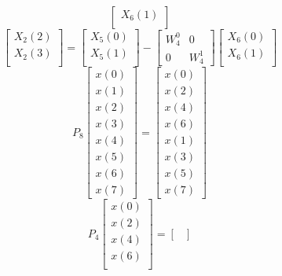 \documentclass[journal,12pt,twocolumn]{IEEEtran}
\numberwithin{equation}{section}
\renewcommand\thesection{\arabic{section}}
\begin{document}
\begin{enumerate}[label=\arabic*.,ref=\thesection.\theenumi]
\begin{equation}
\begin{bmatrix}
X_{6}(1) \\ 
\end{bmatrix}
\label{4to2_3}
\end{equation}
\begin{equation}
\begin{bmatrix}
X_{2}(2) \\ 
X_{2}(3)\\ 
\end{bmatrix}
=
\begin{bmatrix}
X_{5}(0) \\ 
X_{5}(1)\\ 
\end{bmatrix}
-
\begin{bmatrix}
W^{0}_{4} & 0\\
0 & W^{1}_{4}
\end{bmatrix}
\begin{bmatrix}
X_{6}(0) \\ 
X_{6}(1) \\ 
\end{bmatrix}
\label{4to2_4}
\end{equation}
\begin{equation}
P_{8}
\begin{bmatrix}
x(0) \\ 
x(1) \\ 
x(2) \\ 
x(3) \\ 
x(4) \\ 
x(5) \\
x(6) \\
x(7)
\end{bmatrix}
 = 
\begin{bmatrix}
x(0) \\ 
x(2) \\ 
x(4) \\ 
x(6) \\
x(1) \\ 
x(3) \\ 
x(5) \\
x(7)
\end{bmatrix}\label{P_8}
\end{equation}
\begin{equation}
P_{4}
\begin{bmatrix}
x(0) \\ 
x(2) \\ 
x(4) \\ 
x(6) \\
\end{bmatrix}
 = 
\begin{bmatrix}

\end{bmatrix}
\end{equation}
\end{enumerate}
\end{document}
